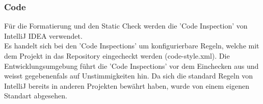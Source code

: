\subsubsection{Code}
Für die Formatierung und den Static Check werden die 'Code Inspection' von IntelliJ IDEA verwendet.
\\
Es handelt sich bei den 'Code Inspections' um konfigurierbare Regeln, welche mit dem Projekt in das Repository eingecheckt werden (code-style.xml). Die Entwicklungsumgebung führt die 'Code Inspections' vor dem Einchecken aus und weisst gegebenenfals auf Unstimmigkeiten hin.
Da sich die standard Regeln von IntelliJ bereits in anderen Projekten bewährt haben, wurde von einem eigenen Standart abgesehen.
\newpage
